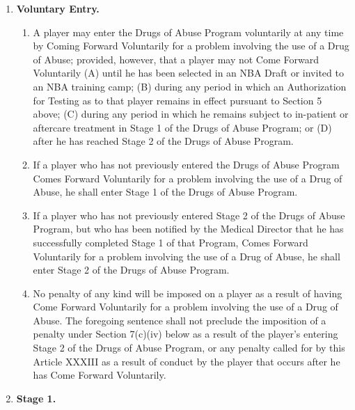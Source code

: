 \documentclass[
]{book}
\providecommand{\tightlist}{%
  \setlength{\itemsep}{0pt}\setlength{\parskip}{0pt}}
\begin{document}
\begin{enumerate}
\def\labelenumi{(\alph{enumi})}
\item
  \textbf{Voluntary Entry.}

  \begin{enumerate}
  \def\labelenumii{(\roman{enumii})}
  \tightlist
  \item
    A player may enter the Drugs of Abuse Program voluntarily at any time by Coming Forward Voluntarily for a problem involving the use of a Drug of Abuse; provided, however, that a player may not Come Forward Voluntarily (A) until he has been selected in an NBA Draft or invited to an NBA training camp; (B) during any period in which an Authorization for Testing as to that player remains in effect pursuant to Section 5 above; (C) during any period in which he remains subject to in-patient or aftercare treatment in Stage 1 of the Drugs of Abuse Program; or (D) after he has reached Stage 2 of the Drugs of Abuse Program.
  \item
    If a player who has not previously entered the Drugs of Abuse Program Comes Forward Voluntarily for a problem involving the use of a Drug of Abuse, he shall enter Stage 1 of the Drugs of Abuse Program.
  \item
    If a player who has not previously entered Stage 2 of the Drugs of Abuse Program, but who has been notified by the Medical Director that he has successfully completed Stage 1 of that Program, Comes Forward Voluntarily for a problem involving the use of a Drug of Abuse, he shall enter Stage 2 of the Drugs of Abuse Program.
  \item
    No penalty of any kind will be imposed on a player as a result of having Come Forward Voluntarily for a problem involving the use of a Drug of Abuse. The foregoing sentence shall not preclude the imposition of a penalty under Section 7(c)(iv) below as a result of the player's entering Stage 2 of the Drugs of Abuse Program, or any penalty called for by this Article XXXIII as a result of conduct by the player that occurs after he has Come Forward Voluntarily.
  \end{enumerate}
\item
  \textbf{Stage 1.}


\end{enumerate}
\end{document}
